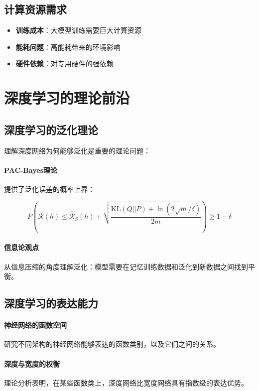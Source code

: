 \subsection{计算资源需求}

\begin{itemize}
\item \textbf{训练成本}：大模型训练需要巨大计算资源
\item \textbf{能耗问题}：高能耗带来的环境影响
\item \textbf{硬件依赖}：对专用硬件的强依赖
\end{itemize}

\section{深度学习的理论前沿}

\subsection{深度学习的泛化理论}

理解深度网络为何能够泛化是重要的理论问题：

\paragraph{PAC-Bayes理论}
提供了泛化误差的概率上界：

$$P\left(\mathcal{R}(h) \leq \hat{\mathcal{R}}_S(h) + \sqrt{\frac{\text{KL}(Q||P) + \ln(2\sqrt{m}/\delta)}{2m}}\right) \geq 1-\delta$$

\paragraph{信息论观点}
从信息压缩的角度理解泛化：模型需要在记忆训练数据和泛化到新数据之间找到平衡。

\subsection{深度学习的表达能力}

\paragraph{神经网络的函数空间}
研究不同架构的神经网络能够表达的函数类别，以及它们之间的关系。

\paragraph{深度与宽度的权衡}
理论分析表明，在某些函数类上，深度网络比宽度网络具有指数级的表达优势。

